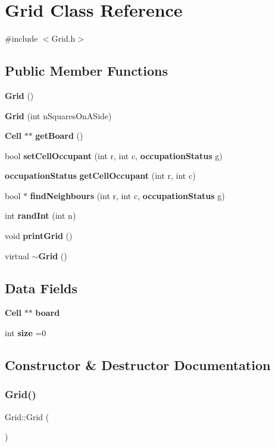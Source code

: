 \section{Grid Class Reference}
\label{classGrid}


{\ttfamily \#include $<$Grid.\+h$>$}

\subsection*{Public Member Functions}
\begin{DoxyCompactItemize}
\item 
\textbf{ Grid} ()
\item 
\textbf{ Grid} (int n\+Squares\+On\+A\+Side)
\item 
\textbf{ Cell} $\ast$$\ast$ \textbf{ get\+Board} ()
\item 
bool \textbf{ set\+Cell\+Occupant} (int r, int c, \textbf{ occupation\+Status} g)
\item 
\textbf{ occupation\+Status} \textbf{ get\+Cell\+Occupant} (int r, int c)
\item 
bool $\ast$ \textbf{ find\+Neighbours} (int r, int c, \textbf{ occupation\+Status} g)
\item 
int \textbf{ rand\+Int} (int n)
\item 
void \textbf{ print\+Grid} ()
\item 
virtual \textbf{ $\sim$\+Grid} ()
\end{DoxyCompactItemize}
\subsection*{Data Fields}
\begin{DoxyCompactItemize}
\item 
\textbf{ Cell} $\ast$$\ast$ \textbf{ board}
\item 
int \textbf{ size} =0
\end{DoxyCompactItemize}


\subsection{Constructor \& Destructor Documentation}
\mbox{\label{classGrid_a4ac9ff4f63552b4c61ff90fcb35ad66c}} 
\subsubsection{Grid()\hspace{0.1cm}{\footnotesize\ttfamily [1/2]}}
{\footnotesize\ttfamily Grid\+::\+Grid (\begin{DoxyParamCaption}{ }\end{DoxyParamCaption})}



